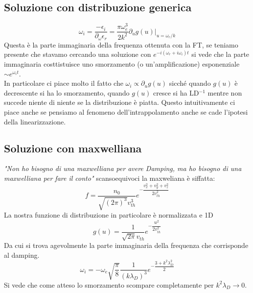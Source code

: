 \subsection{Soluzione con distribuzione generica}
\[\boxed{\omega_i=\dfrac{-\epsilon_i}{\partial _\omega\epsilon_r}=\frac{\pi\omega_e^3}{2k^2}\partial_ug(u)\bigg|_{u=\omega_r/k}}\]   
Questa è la parte immaginaria della frequenza ottenuta con la FT, se teniamo presente che stavamo cercando una soluzione con $e^{-i(\omega_r+i\omega_i) t}$ si vede che la parte immaginaria costtistuisce uno smorzamento (o un'amplificazione) esponenziale $\sim e^{\omega_it}$.\\In particolare ci piace molto il fatto che $\omega_i\propto \partial_ug(u)$ sicché quando $g(u)$ è decrescente si ha lo smorzamento, quando $g(u)$ cresce si ha LD$^{-1}$ mentre non succede niente di niente se la distribuzione è piatta. Questo intuitivamente ci piace anche se pensiamo al fenomeno dell'intrappolamento anche se cade l'ipotesi della linearizzazione.  

%
%
%
\subsection{Soluzione con maxwelliana} 
\textit{"Non ho bisogno di una maxwelliana per avere Damping, ma ho bisogno di una maxwelliana per fare il conto"}  scansoequivoci la maxweliana è siffatta:
\[f=\frac{n_0}{\sqrt{(2\pi)^3}v_{th}^3}e^{-\dfrac{v_x^2+v_y^2+v_z^2}{2v_{th}^2}}\]
La nostra funzione di distribuzione in particolare è normalizzata e 1D
\[g(u)=\frac{1}{\sqrt{2\pi}v_{th}}e^{-\dfrac{u^2}{2v_{th}^2}}\]
Da cui si trova agevolmente la parte immaginaria della frequenza che corrisponde al damping. 
\[\boxed{\omega_i=-\omega_e\sqrt{\frac{\pi}{8}}\frac{1}{(k\lambda_D)^3}e^{-\dfrac{3+k^2\lambda_D^2}{2}}}\]
Si vede che come atteso lo smorzamento scompare completamente per $k^2\lambda_D\to0$. 

